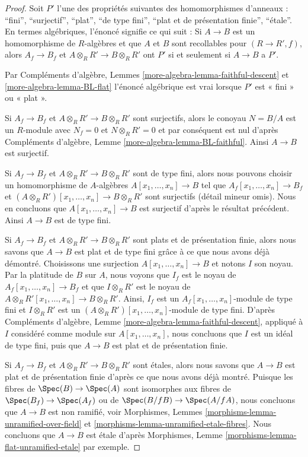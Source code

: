 \begin{proof}
Soit $P'$ l'une des propriétés suivantes des homomorphismes d'anneaux :
``fini'', ``surjectif'', ``plat'', ``de type fini'',
``plat et de présentation finie'', ``\'etale''.
En termes algébriques, l'énoncé signifie ce qui suit :
Si $A \to B$ est un homomorphisme de $R$-algèbres et que $A$ et $B$
sont recollables pour $(R \to R', f)$, alors
$A_f \to B_f$ et $A \otimes_R R' \to B \otimes_R R'$ ont $P'$
si et seulement si $A \to B$ a $P'$.

\medskip\noindent
Par Compléments d'algèbre, Lemmes \ref{more-algebra-lemma-faithful-descent}
et \ref{more-algebra-lemma-BL-flat} l'énoncé algébrique
est vrai lorsque $P'$ est « fini » ou « plat ».

\medskip\noindent
Si $A_f \to B_f$ et $A \otimes_R R' \to B \otimes_R R'$ sont surjectifs,
alors le conoyau $N = B/A$ est un $R$-module avec $N_f = 0$ et $N \otimes_R R' = 0$ et
par conséquent est nul d'après Compléments d'algèbre, Lemme
\ref{more-algebra-lemma-BL-faithful}. Ainsi $A \to B$ est surjectif.

\medskip\noindent
Si $A_f \to B_f$ et $A \otimes_R R' \to B \otimes_R R'$ sont de type fini,
alors nous pouvons choisir un homomorphisme de $A$-algèbres $A[x_1, \ldots, x_n] \to B$
tel que $A_f[x_1, \ldots, x_n] \to B_f$ et
$(A \otimes_R R')[x_1, \ldots, x_n] \to B \otimes_R R'$ sont surjectifs
(détail mineur omis). Nous en concluons que $A[x_1, \ldots, x_n] \to B$
est surjectif d'après le résultat précédent. Ainsi $A \to B$ est de type fini.

\medskip\noindent
Si $A_f \to B_f$ et $A \otimes_R R' \to B \otimes_R R'$ sont plats et de présentation finie, alors nous savons que $A \to B$ est plat et de type fini grâce à ce que nous avons déjà démontré. Choisissons une surjection $A[x_1, \ldots, x_n] \to B$ et notons $I$ son noyau. Par la platitude de $B$ sur $A$, nous voyons que $I_f$ est le noyau de $A_f[x_1, \ldots, x_n] \to B_f$ et que $I \otimes_R R'$ est le noyau de $A \otimes_R R'[x_1, \ldots, x_n] \to B \otimes_R R'$. Ainsi, $I_f$ est un $A_f[x_1, \ldots, x_n]$-module de type fini et $I \otimes_R R'$ est un $(A \otimes_R R')[x_1, \ldots, x_n]$-module de type fini. D'après Compléments d'algèbre, Lemme \ref{more-algebra-lemma-faithful-descent}, appliqué à $I$ considéré comme module sur $A[x_1, \ldots, x_n]$, nous concluons que $I$ est un idéal de type fini, puis que $A \to B$ est plat et de présentation finie.

\medskip\noindent
Si $A_f \to B_f$ et $A \otimes_R R' \to B \otimes_R R'$ sont \'etales,
alors nous savons que $A \to B$ est plat et de présentation finie d'après ce que
nous avons déjà montré. Puisque les fibres de $\Spec(B) \to \Spec(A)$
sont isomorphes aux fibres de $\Spec(B_f) \to \Spec(A_f)$ ou
de $\Spec(B/fB) \to \Spec(A/fA)$, nous concluons que $A \to B$ est non ramifié,
voir Morphismes, Lemmes \ref{morphisms-lemma-unramified-over-field}
et \ref{morphisms-lemma-unramified-etale-fibres}.
Nous concluons que $A \to B$ est \'etale d'après
Morphismes, Lemme \ref{morphisms-lemma-flat-unramified-etale} par exemple.
\end{proof}

